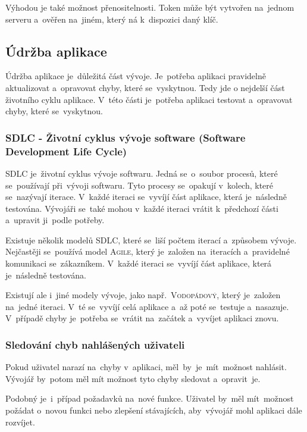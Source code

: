 \documentclass[14pt,a4paper]{article}
\begin{document}
            Výhodou je také možnost přenositelnosti. Token může být vytvořen na~jednom serveru a~ověřen na~jiném, který ná k~dispozici daný klíč.\parencite{ieee:jwt}

        \subsection{Údržba aplikace}
        Údržba aplikace je~důležitá část vývoje. Je~potřeba aplikaci pravidelně aktualizovat a~opravovat chyby, které se~vyskytnou.
        Tedy jde o nejdelší část životního cyklu aplikace. V~této části je~potřeba aplikaci testovat a~opravovat chyby, které se~vyskytnou.
        
            \subsubsection{SDLC - Životní cyklus vývoje software (Software Development Life Cycle)}
            SDLC je~životní cyklus vývoje softwaru. Jedná se~o~soubor procesů, které se~používají při~vývoji softwaru.
            Tyto procesy se~opakují v~kolech, které se~nazývají iterace. V~každé iteraci se~vyvíjí část aplikace, která je~následně testována.
            Vývojáři se~také mohou v~každé iteraci vrátit k~předchozí části a~upravit ji~podle potřeby.

            Existuje několik modelů \textsc{SDLC}, které se~liší počtem iterací a~způsobem vývoje. Nejčastěji se~používá model \textsc{Agile},
            který je~založen na~iteracích a~pravidelné komunikaci se~zákazníkem. V~každé iteraci se~vyvíjí část aplikace, která je~následně testována.

            Existují ale i~jiné modely vývoje, jako např.~\textsc{Vodopádový}, který je~založen na~jedné iteraci.
            V~té se~vyvíjí celá aplikace a~až poté se~testuje a~nasazuje.
            V~případě chyby je~potřeba se~vrátit na~začátek a~vyvíjet aplikaci znovu.

            \subsubsection{Sledování chyb nahlášených uživateli}
            Pokud uživatel narazí na~chyby v~aplikaci, měl~by~je~mít~možnost nahlásit. Vývojář by~potom měl mít možnost tyto chyby sledovat a~opravit~je.

            Podobný je~i~případ požadavků na~nové funkce. Uživatel by~měl mít~možnost požádat o~novou funkci nebo zlepšení stávajících,
            aby~vývojář mohl aplikaci dále rozvíjet.
\end{document}
